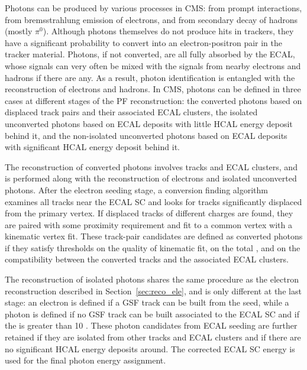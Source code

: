 Photons can be produced by various processes in CMS: from prompt interactions, 
from bremsstrahlung emission of electrons, and from secondary decay of hadrons (mostly $\pi^{0}$).
Although photons themselves do not produce hits in trackers, 
they have a significant probability to convert into an electron-positron pair in the tracker material.
Photons, if not converted, are all fully absorbed by the ECAL,
whose signals can very often be mixed with the signals from nearby electrons and hadrons if there are any.
As a result, photon identification is entangled with the reconstruction of electrons and hadrons.
In CMS, photons can be defined in three cases at different stages of the PF reconstruction:
the converted photons based on displaced track pairs and their associated ECAL clusters,
the isolated unconverted photons based on ECAL deposits with little HCAL energy deposit behind it,
and the non-isolated unconverted photons based on ECAL deposits with significant HCAL energy deposit behind it.

The reconstruction of converted photons involves tracks and ECAL clusters, 
and is performed along with the reconstruction of electrons and isolated unconverted photons.
After the electron seeding stage, a conversion finding algorithm~\cite{2015photon} examines all tracks near the ECAL SC
and looks for tracks significantly displaced from the primary vertex.
If displaced tracks of different charges are found, they are paired with some proximity requirement 
and fit to a common vertex with a kinematic vertex fit.
These track-pair candidates are defined as converted photons if they satisfy thresholds on the quality of kinematic fit,
on the total \pt, and on the compatibility between the converted tracks and the associated ECAL clusters.

The reconstruction of isolated photons shares the same procedure as the electron reconstruction described in Section~\ref{sec:reco_ele},
and is only different at the last stage:
an electron is defined if a GSF track can be built from the seed, 
while a photon is defined if no GSF track can be built associated to the ECAL SC 
and if the \ET is greater than 10 \GeV.
These photon candidates from ECAL seeding are further retained if they are isolated from other tracks and ECAL clusters
and if there are no significant HCAL energy deposits around.
The corrected ECAL SC energy is used for the final photon energy assignment. 

